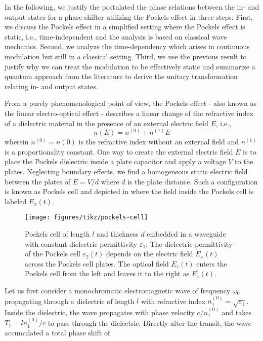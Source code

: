 In the following, we justify the postulated the phase relations between the in- and output states for a phase-shifter utilizing the Pockels effect in three steps:
First, we discuss the Pockels effect in a simplified setting where the Pockels effect is static, i.e., time-independent and the analysis is based on classical wave mechanics.
Second, we analyze the time-dependency which arises in continuous modulation but still in a classical setting.
Third, we use the previous result to justify why we can treat the modulation to be effectively static and summarize a quantum approach from the literature to derive the unitary transformation relating in- and output states.

From a purely phenomenological point of view, the Pockels effect - also known as the linear electro-optical effect - describes a linear change of the refractive index of a dielectric material in the presence of an external electric field $E$, i.e.,
\begin{equation}
	n(E)
	=
	n^{(0)}
	+
	n^{(1)}E
\end{equation}
wherein $n^{(0)}=n(0)$ is the refractive index without an external field and $n^{(1)}$ is a proportionality constant.
One way to create the external electric field $E$ is to place the Pockels dielectric inside a plate capacitor and apply a voltage $V$ to the plates.
Neglecting boundary effects, we find a homogeneous static electric field between the plates of $E=V/d$ where $d$ is the plate distance.
Such a configuration is known as Pockels cell and depicted in  where the field inside the Pockels cell is labeled $E_x(t)$.
\begin{figure}[htb]
    \centering
    \texttt{[image: figures/tikz/pockels-cell]}
    \caption{Pockels cell of length $l$ and thickness $d$ embedded in a waveguide with constant dielectric permittivity $\varepsilon_1$: The dielectric permittivity of the Pockels cell $\varepsilon_2(t)$ depends on the electric field $E_x(t)$ across the Pockels cell plates. The optical field $E_z(t)$ enters the Pockels cell from the left and leaves it to the right as $E^\prime_z(t)$.}\label{fig:pockels_cell}
\end{figure}
Let us first consider a monochromatic electromagnetic wave of frequency $\omega_0$ propagating through a dielectric of length $l$ with refractive index $n_1^{(0)}=\sqrt{\varepsilon_1}$.
Inside the dielectric, the wave propagates with phase velocity $c/n_1^{(0)}$ and takes $T_1=ln_1^{(0)}/c$ to pass through the dielectric.
Directly after the transit, the wave accumulated a total phase shift of
